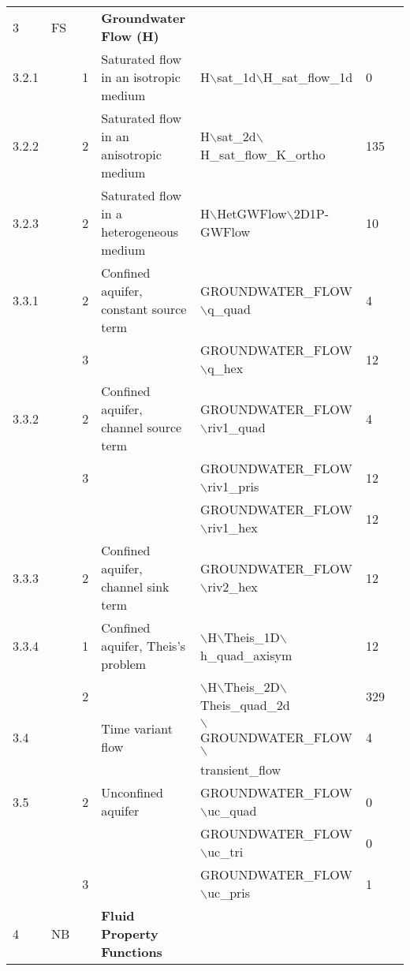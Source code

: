 \begin{landscape}
\begin{center}
\begin{tabularx}{\linewidth}{lllXXll}
3       &FS&&\textbf{Groundwater Flow (H)}&&&\\
3.2.1&&         1&      Saturated flow in an isotropic medium &H$\backslash$sat\_1d$\backslash$H\_sat\_flow\_1d&0&\\
3.2.2&&         2&      Saturated flow in an anisotropic medium&H$\backslash$sat\_2d$\backslash$H\_sat\_flow\_K\_ortho&135&\\
3.2.3&&         2&      Saturated flow in a heterogeneous medium&       H$\backslash$HetGWFlow$\backslash$2D1P-GWFlow&10&\\
3.3.1&&         2&      Confined aquifer, constant source term&GROUNDWATER\_FLOW$\backslash$q\_quad&4&\\
     &&     3&&GROUNDWATER\_FLOW$\backslash$q\_hex&12&\\
3.3.2&&         2&      Confined aquifer, channel source term&  GROUNDWATER\_FLOW$\backslash$riv1\_quad&4&\\
                 &&     3&&GROUNDWATER\_FLOW$\backslash$riv1\_pris&12&\\
                 &&&&GROUNDWATER\_FLOW$\backslash$riv1\_hex&12&\\
3.3.3&&         2&      Confined aquifer, channel sink term&GROUNDWATER\_FLOW$\backslash$riv2\_hex&12&\\
3.3.4&&         1&      Confined aquifer, Theis's problem&$\backslash$H$\backslash$Theis\_1D$\backslash$h\_quad\_axisym&12&\\
     &&         2&                                                                                                                                              &$\backslash$H$\backslash$Theis\_2D$\backslash$Theis\_quad\_2d&329&\\
3.4&&&Time variant flow&$\backslash$GROUNDWATER\_FLOW$\backslash$&4&\\
&&&&transient\_flow&&\\  
3.5  &&         2&      Unconfined aquifer&GROUNDWATER\_FLOW$\backslash$uc\_quad&0&\\
&&                                                                                                                      &&GROUNDWATER\_FLOW$\backslash$uc\_tri&0&\\
&&                              3&                                                                              &GROUNDWATER\_FLOW$\backslash$uc\_pris&1&\\
\midrule
4&NB&&\textbf{  Fluid Property Functions }&&&\\


\end{tabularx}
\end{center}
\end{landscape}
